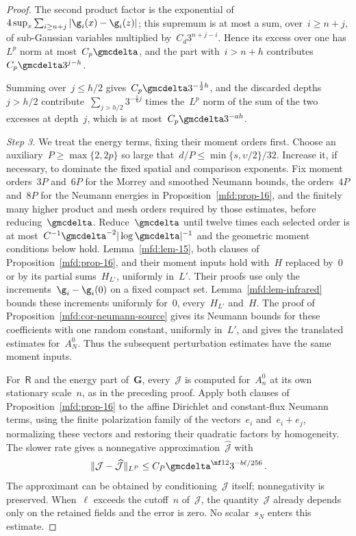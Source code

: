 \documentclass[11pt]{amsart}
\begin{document}
\begin{proof}
\smallskip

The second product factor is the exponential of~$4\sup_x\sum_{i\geq n+j}|\g_i(x)-\g_i(z)|$; this supremum is at most a sum, over~$i\geq n+j$, of sub-Gaussian variables multiplied by~$C_d3^{n+j-i}$. Hence its excess over one has~$L^p$ norm at most~$C_p\gmcdelta$, and the part with~$i>n+h$ contributes~$C_p\gmcdelta3^{j-h}$.

\smallskip

Summing over~$j\leq h/2$ gives~$C_p\gmcdelta3^{-\frac12h}$, and the discarded depths~$j>h/2$ contribute~$\sum_{j>h/2}3^{-\frac{s}{8}j}$ times the~$L^p$ norm of the sum of the two excesses at depth~$j$, which is at most~$C_p\gmcdelta3^{-ah}$.

\smallskip

\emph{Step 3.} We treat the energy terms, fixing their moment orders first. Choose an auxiliary~$P\geq\max\{2,2p\}$ so large that~$d/P\leq\min\{s,\upsilon/2\}/32$. Increase it, if necessary, to dominate the fixed spatial and comparison exponents. Fix moment orders~$3P$ and~$6P$ for the Morrey and smoothed Neumann bounds, the orders~$4P$ and~$8P$ for the Neumann energies in Proposition~\ref{mfd:prop-16}, and the finitely many higher product and mesh orders required by those estimates, before reducing~$\gmcdelta$. Reduce~$\gmcdelta$ until twelve times each selected order is at most~$C^{-1}\gmcdelta^{-2}|\log\gmcdelta|^{-1}$ and the geometric moment conditions below hold. Lemma~\ref{mfd:lem-15}, both clauses of Proposition~\ref{mfd:prop-16}, and their moment inputs hold with~$H$ replaced by~$0$ or by its partial sums~$H_{L'}$, uniformly in~$L'$. Their proofs use only the increments~$\g_i-\g_i(0)$ on a fixed compact set. Lemma~\ref{mfd:lem-infrared} bounds these increments uniformly for~$0$, every~$H_{L'}$ and~$H$. The proof of Proposition~\ref{mfd:cor-neumann-source} gives its Neumann bounds for these coefficients with one random constant, uniformly in~$L'$, and gives the translated estimates for~$A_N^0$. Thus the subsequent perturbation estimates have the same moment inputs.

\smallskip

For~$\mathsf R$ and the energy part of~$\mathbf G$, every~$\mathcal J$ is computed for~$A_n^0$ at its own stationary scale~$n$, as in the preceding proof. Apply both clauses of Proposition~\ref{mfd:prop-16} to the affine Dirichlet and constant-flux Neumann terms, using the finite polarization family of the vectors~$e_i$ and~$e_i+e_j$, normalizing these vectors and restoring their quadratic factors by homogeneity. The slower rate gives a nonnegative approximation~$\widehat{\mathcal J}$ with
\begin{equation*}
	\|\mathcal J-\widehat{\mathcal J}\|_{L^P}
	\leq C_P\gmcdelta^{\nf12}3^{-b\ell/256}\,.
\end{equation*}
The approximant can be obtained by conditioning~$\mathcal J$ itself; nonnegativity is preserved. When~$\ell$ exceeds the cutoff~$n$ of~$\mathcal J$, the quantity~$\mathcal J$ already depends only on the retained fields and the error is zero. No scalar~$s_N$ enters this estimate.


\end{proof}
\end{document}
